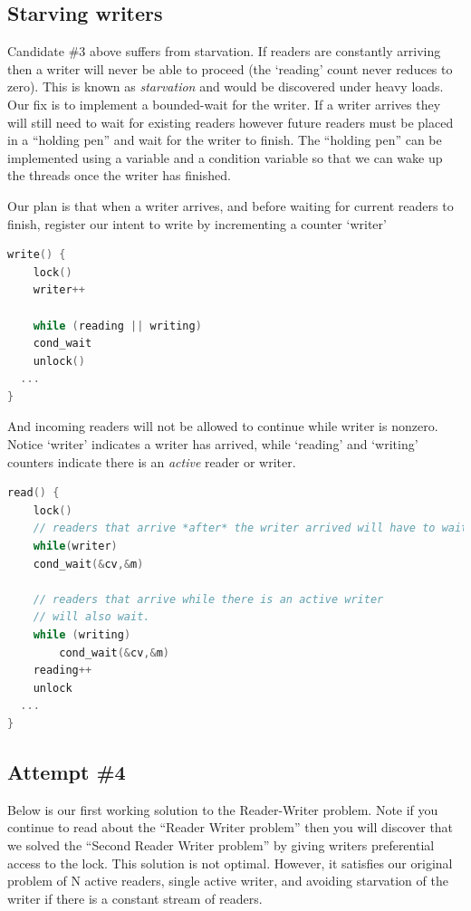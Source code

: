 \subsection{Starving writers}

Candidate \#3 above suffers from starvation.
If readers are constantly arriving then a writer will never be able to proceed (the `reading' count never reduces to zero).
This is known as \emph{starvation} and would be discovered under heavy loads.
Our fix is to implement a bounded-wait for the writer.
If a writer arrives they will still need to wait for existing readers however future readers must be placed in a ``holding pen'' and wait for the writer to finish.
The ``holding pen'' can be implemented using a variable and a condition variable so that we can wake up the threads once the writer has finished.

Our plan is that when a writer arrives, and before waiting for current readers to finish, register our intent to write by incrementing a counter `writer'

\begin{lstlisting}[language=C]
write() {
    lock()
    writer++

    while (reading || writing)
    cond_wait
    unlock()
  ...
}
\end{lstlisting}

And incoming readers will not be allowed to continue while writer is nonzero.
Notice `writer' indicates a writer has arrived, while `reading' and `writing' counters indicate there is an \emph{active} reader or writer.

\begin{lstlisting}[language=C]
read() {
    lock()
    // readers that arrive *after* the writer arrived will have to wait here!
    while(writer)
    cond_wait(&cv,&m)

    // readers that arrive while there is an active writer
    // will also wait.
    while (writing)
        cond_wait(&cv,&m)
    reading++
    unlock
  ...
}
\end{lstlisting}

\subsection{Attempt \#4}

Below is our first working solution to the Reader-Writer problem.
Note if you continue to read about the ``Reader Writer problem'' then you will discover that we solved the ``Second Reader Writer problem'' by giving writers preferential access to the lock.
This solution is not optimal.
However, it satisfies our original problem of N active readers, single active writer, and avoiding starvation of the writer if there is a constant stream of readers.

